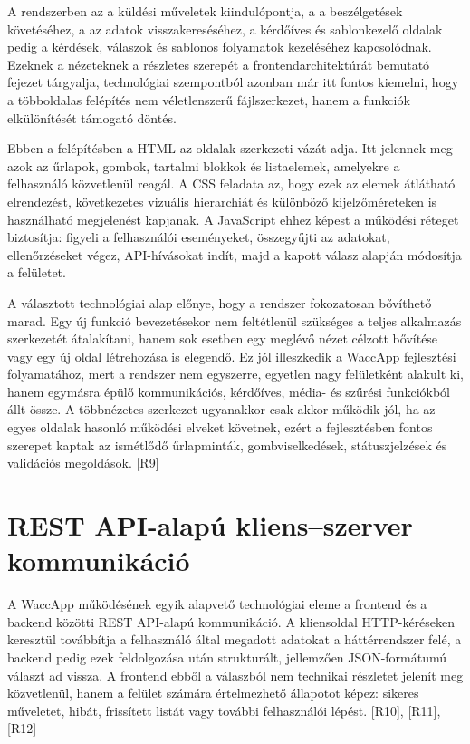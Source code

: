 A rendszerben az  a küldési műveletek kiindulópontja, a  a beszélgetések követéséhez, a  az adatok visszakereséséhez, a kérdőíves és sablonkezelő oldalak pedig a kérdések, válaszok és sablonos folyamatok kezeléséhez kapcsolódnak. Ezeknek a nézeteknek a részletes szerepét a frontendarchitektúrát bemutató fejezet tárgyalja, technológiai szempontból azonban már itt fontos kiemelni, hogy a többoldalas felépítés nem véletlenszerű fájlszerkezet, hanem a funkciók elkülönítését támogató döntés.

Ebben a felépítésben a HTML az oldalak szerkezeti vázát adja. Itt jelennek meg azok az űrlapok, gombok, tartalmi blokkok és listaelemek, amelyekre a felhasználó közvetlenül reagál. A CSS feladata az, hogy ezek az elemek átlátható elrendezést, következetes vizuális hierarchiát és különböző kijelzőméreteken is használható megjelenést kapjanak. A JavaScript ehhez képest a működési réteget biztosítja: figyeli a felhasználói eseményeket, összegyűjti az adatokat, ellenőrzéseket végez, API-hívásokat indít, majd a kapott válasz alapján módosítja a felületet.

A választott technológiai alap előnye, hogy a rendszer fokozatosan bővíthető marad. Egy új funkció bevezetésekor nem feltétlenül szükséges a teljes alkalmazás szerkezetét átalakítani, hanem sok esetben egy meglévő nézet célzott bővítése vagy egy új oldal létrehozása is elegendő. Ez jól illeszkedik a WaccApp fejlesztési folyamatához, mert a rendszer nem egyszerre, egyetlen nagy felületként alakult ki, hanem egymásra épülő kommunikációs, kérdőíves, média- és szűrési funkciókból állt össze. A többnézetes szerkezet ugyanakkor csak akkor működik jól, ha az egyes oldalak hasonló működési elveket követnek, ezért a fejlesztésben fontos szerepet kaptak az ismétlődő űrlapminták, gombviselkedések, státuszjelzések és validációs megoldások. [R9]

\section{REST API-alapú kliens–szerver kommunikáció}

A WaccApp működésének egyik alapvető technológiai eleme a frontend és a backend közötti REST API-alapú kommunikáció. A kliensoldal HTTP-kéréseken keresztül továbbítja a felhasználó által megadott adatokat a háttérrendszer felé, a backend pedig ezek feldolgozása után strukturált, jellemzően JSON-formátumú választ ad vissza. A frontend ebből a válaszból nem technikai részletet jelenít meg közvetlenül, hanem a felület számára értelmezhető állapotot képez: sikeres műveletet, hibát, frissített listát vagy további felhasználói lépést. [R10], [R11], [R12]

